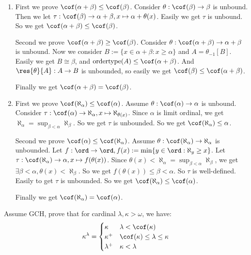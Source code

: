 \documentclass[a5paper]{ctexart}
\begin{document}
\begin{solution}
  \begin{enumerate}
    \item First we prove \(\cof( \alpha+\beta) \leq \cof( \beta)\). Consider \(\theta:\cof( \beta) \to \beta\) is unbound. 
      Then we let \(\tau:\cof( \beta) \to \alpha+\beta,x \mapsto \alpha+\theta( x)\). Easily we get \(\tau\) is unbound. 
      So we get \(\cof( \alpha+\beta)\leq \cof( \beta)\). 

      Second we prove \(\cof( \alpha+\beta) \geq \cof( \beta)\). Consider \(\theta:\cof( \alpha+\beta) \to \alpha+\beta\) is unbound. 
      Now we consider \(B:=\{ x \in \alpha+\beta:x \geq \alpha\}\) and \(A=\theta_{-1}[ B]\). 
      Easily we get \(B \cong \beta\), and \(\text{ordertype}( A)\leq \cof( \alpha+\beta)\). 
      And \(\res{\theta}{A}:A \to B\) is unbounded, so easily we get \(\cof( \beta)\leq \cof( \alpha+\beta)\). 

      Finally we get \(\cof( \alpha+\beta)=\cof( \beta)\). 
    \item First we prove \(\cof( \aleph_{\alpha})\leq \cof( \alpha)\). Assume \(\theta:\cof( \alpha) \to \alpha\) is unbound. 
      Consider \(\tau:\cof( \alpha) \to \aleph_\alpha,x \mapsto \aleph_{\theta( x)}\). 
      Since \(\alpha\) is limit ordinal, we get \(\aleph_\alpha=\sup_{\beta<\alpha}\aleph_\beta\). 
      So we get \(\tau\) is unbounded. So we get \(\cof( \aleph_\alpha)\leq \alpha\). 

      Second we prove \(\cof( \alpha) \leq \cof( \aleph_\alpha)\). Assume \(\theta:\cof( \aleph_\alpha) \to \aleph_\alpha\) is unbounded. 
      Let \(f:\ord \to \ord,f( x):=\min\{ y \in \ord:\aleph_y \geq x\}\). 
      Let \(\tau:\cof( \aleph_\alpha)\to \alpha,x \mapsto f( \theta( x))\). 
      Since \(\theta( x)<\aleph_\alpha = \sup_{\beta<\alpha}\aleph_\beta\), we get \(\exists \beta < \alpha,\theta( x)<\aleph_\beta\). 
      So we get \(f( \theta( x)) \leq \beta < \alpha\). So \(\tau\) is well-defined. 
      Easily to get \(\tau\) is unbounded. So we get \(\cof( \aleph_\alpha)\leq \cof( \alpha)\). 

      Finally we get \(\cof( \aleph_\alpha)=\cof( \alpha)\). 
  \end{enumerate}
\end{solution}
\begin{problem}\label{pro:4}
  Assume GCH, prove that for cardinal \(\lambda,\kappa>\omega\), we have:
    \[\kappa^\lambda=\begin{cases}
    \kappa & \lambda<\cof( \kappa)\\
    \kappa^+ & \cof( \kappa)\leq \lambda \leq \kappa\\
    \lambda^+ & \kappa<\lambda
    \end{cases}\]
\end{problem}
\end{document}

